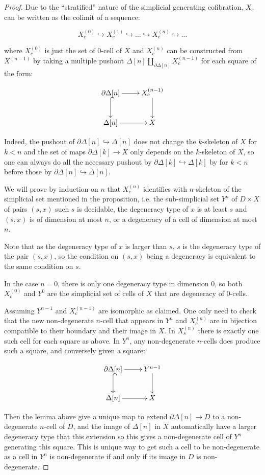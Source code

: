 \documentclass[reqno,10pt,a4paper,oneside,draft]{amsart}
\begin{document}
\begin{proof}

Due to the ``stratified'' nature of the simplicial generating cofibration, $X_c$ can be written as the colimit of a sequence:


 \[ X^{(0)}_c \hookrightarrow X^{(1)}_c \hookrightarrow \dots \hookrightarrow X^{(n)}_c \hookrightarrow \dots \]

where $X^{(0)}_c$ is just the set of $0$-cell of $X$ and $X^{(n)}_c$ can be constructed from $X^{(n-1)}$ by taking a multiple pushout $\Delta[n] \coprod_{\partial \Delta[n]} X^{(n-1)}_c$ for each square of the form:

\[ \xymatrix{\partial \Delta[n]  \ar[r] \ar@{^{(}->}[d] & X^{(n-1)}_c \ar[d] \\ \Delta[n]  \ar[r] & X} \]

Indeed, the pushout of $\partial \Delta[n] \hookrightarrow \Delta[n]$ does not change the $k$-skeleton of $X$ for $k <n$ and the set of maps $\partial \Delta[k] \rightarrow X$ only depends on the $k$-skeleton of $X$, so one can always do all the necessary pushout by $\partial \Delta[k] \hookrightarrow \Delta[k]$ by for $k<n$ before those by $\partial \Delta[n] \hookrightarrow \Delta[n]$.


We will prove by induction on $n$ that $X^{(n)}_c$ identifies with $n$-skeleton of the simplicial set mentioned in the proposition, i.e. the sub-simplicial set $Y^n$ of $D \times X$ of pairs $(s,x)$ such $s$ is decidable,  the degeneracy type of $x$ is at least $s$ and $(s,x)$ is of dimension at most $n$, or a degeneracy of a cell of dimension at most $n$.

Note that as the degeneracy type of $x$ is larger than $s$, $s$ is the degeneracy type of the pair $(s,x)$, so the condition on $(s,x)$ being a degeneracy is equivalent to the same condition on $s$.

In the case $n=0$, there is only one degeneracy type in dimension $0$, so both $X^{(0)}_c$ and $Y^0$ are the simplicial set of cells of $X$ that are degeneracy of $0$-cells.

Assuming $Y^{n-1}$ and $X^{(n-1)}_c$ are isomorphic as claimed. One only need to check that the new non-degenerate $n$-cell that appears in $Y^{n}$ and $X^{(n)}_c$ are in bijection compatible to their boundary and their image in $X$.
In $X^{(n)}_s$ there is exactly one such cell for each square as above. In $Y^{n}$, any non-degenerate $n$-cells does produce such a square, and conversely given a square:

\[ \xymatrix{\partial \Delta[n]  \ar[r] \ar@{^{(}->}[d] & Y^{n-1} \ar[d] \\ \Delta[n]  \ar[r] & X} \]

Then the lemma above give a unique map to extend $\partial \Delta[n] \rightarrow D$ to a non-degenerate $n$-cell of $D$, and the image of $\Delta[n]$ in $X$ automatically have a larger degeneracy type that this extension so this gives a non-degenerate cell of $Y^{n}$ generating this square. This is unique way to get such a cell to be non-degenerate as a cell in $Y^n$ is non-degenerate if and only if its image in $D$ is non-degenerate.

\end{proof}
\end{document}
